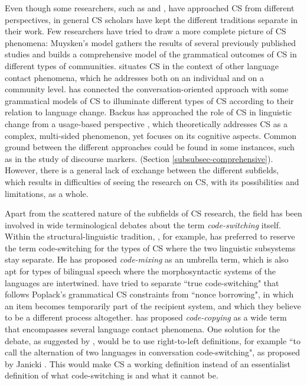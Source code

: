 \documentclass[output=paper,
modfonts
]{langscibook}
\begin{document}
Even though some researchers, such as \cite{myers1993common,myers1997duelling} and \cite{auer1988conversation,auer1999codeswitching}, have approached CS from different perspectives, in general CS scholars have kept the different traditions separate in their work. Few researchers have tried to draw a more complete picture of CS phenomena: Muysken’s model \parencite{muysken2000,muysken2013language} gathers the results of several previously published studies and builds a comprehensive model of the grammatical outcomes of CS in different types of communities. \cite{matras2009language} situates CS in the context of other language contact phenomena, which he addresses both on an individual and on a community level. \cite{auer1999codeswitching} has connected the conversation-oriented approach with some grammatical models of CS to illuminate different types of CS according to their relation to language change. Backus has approached the role of CS in linguistic change from a usage-based perspective \parencite{backus2013usage}, which theoretically addresses CS as a complex, multi-sided phenomenon, yet focuses on its cognitive aspects. Common ground between the different approaches could be found in some instances, such as in the study of discourse markers. (Section \ref {subsubsec-comprehensive}). However, there is a general lack of exchange between the different subfields, which results in difficulties of seeing the research on CS, with its possibilities and limitations, as a whole.

Apart from the scattered nature of the subfields of CS research, the field has been involved in wide terminological debates about the term \textit{code-switching} itself. Within the structural-linguistic tradition, \cite{muysken2000}, for example, has preferred to reserve the term code-switching for the types of CS where the two linguistic subsystems stay separate. He has proposed \textit{code-mixing} as an umbrella term, which is also apt for types of bilingual speech where the morphosyntactic systems of the languages are intertwined. \cite{poplack1998introduction} have tried to separate “true code-switching" that follows Poplack’s grammatical CS constraints from “nonce borrowing", in which an item becomes temporarily part of the recipient system, and which they believe to be a different process altogether. \cite{johanson2002contact} has proposed \textit{code-copying} as a wide term that encompasses several language contact phenomena. One solution for the debate, as suggested by \cite{gardner2009code}, would be to use right-to-left definitions, for example “to call the alternation of two languages in conversation code-switching", as proposed by Janicki \citeyear{janicki1990toward}. This would make CS a working definition instead of an essentialist definition of what code-switching is and what it cannot be.
\end{document}
